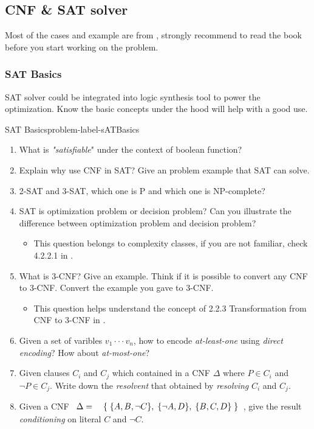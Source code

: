 \documentclass[main.tex]{subfiles}
\begin{document}
\subsection{CNF \& SAT solver}
Most of the cases and example are from \cite{HandbookOfSAT}, strongly recommend to read the book before you start working on the problem.
\subsubsection{SAT Basics}
SAT solver could be integrated into logic synthesis tool to power the optimization. Know the basic concepts under the hood will help with a good use.
\begin{problem}{SAT Basics}{problem-label-sATBasics}
\begin{enumerate}[(1)]
    \item What is \textit{"satisfiable}" under the context of boolean function?
    \item Explain why use CNF in SAT? Give an problem example that SAT can solve.
    \item 2-SAT and 3-SAT, which one is P and which one is NP-complete?
    \item SAT is optimization problem or decision problem? Can you illustrate the difference between optimization problem and decision problem?
    \begin{itemize}
        \item This question belongs to complexity classes, if you are not familiar, check 4.2.2.1 in \cite{EDA2009}.
    \end{itemize}
    \item What is 3-CNF? Give an example. Think if it is possible to convert any CNF to 3-CNF. Convert the example you gave to 3-CNF.
    \begin{itemize}
        \item This question helps understand the concept of 2.2.3 Transformation from CNF to 3-CNF in \cite{HandbookOfSAT}.
    \end{itemize}
    \item Given a set of varibles $ v_{1}\cdot\cdot\cdot v_{n} $, how to encode \textit{at-least-one} using \textit{direct encoding}? How about \textit{at-most-one}?
    \item Given clauses $C_{i}$ and $C_{j}$ which contained in a CNF $\Delta$ where $P \in C_{i}$ and $\lnot P \in C_{j}$. Write down the \textit{resolvent} that obtained by \textit{resolving} $C_{i}$ and $C_{j}$.
    \item Given a CNF $\begin{array}{r l}{\Delta={}}&{{}\{\;\{A,B,\lnot C\},\;\{\lnot A,D\},\;\{B,C,D\}\;\}}\end{array}$, give the result \textit{conditioning} on literal $C$ and $\lnot C$.
\end{enumerate}
\end{problem}
\vspace*{4\baselineskip}
\end{document}
